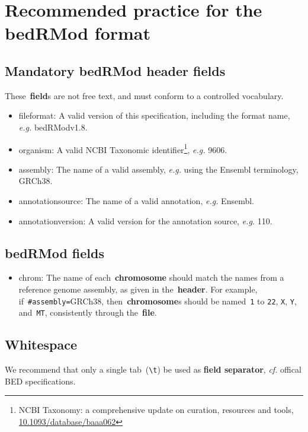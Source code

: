\documentclass[11pt]{article}
\begin{document}
\section{Recommended practice for the \acs{bedRMod} format}

\subsection{Mandatory \acs{bedRMod} header fields}
These~\textbf{field}s are not free text, and must conform to a controlled vocabulary.
\begin{itemize}
\item \textsf{fileformat}: A valid version of this specification, including the format name, \textit{e.g.} bedRModv1.8. 

\item \textsf{organism}: A valid NCBI Taxonomic identifier\footnote{NCBI Taxonomy: a comprehensive update on curation, resources and tools, \url{10.1093/database/baaa062}}, \textit{e.g.} 9606.

\item \textsf{assembly}: The name of a valid assembly, \textit{e.g.} using the Ensembl terminology, GRCh38. 

\item \textsf{annotation\textunderscore source}: The name of a valid annotation, \textit{e.g.} Ensembl. 

\item \textsf{annotation\textunderscore version}: A valid version for the annotation source, \textit{e.g.} 110. 
\end{itemize}

\subsection{\acs{bedRMod} fields}
\begin{itemize}
\item \textsf{chrom}: The name of each~\textbf{chromosome} should match the names from a reference genome assembly, as given in the~\textbf{header}.
  For example, if~\texttt{\#assembly=}GRCh38, then~\textbf{chromosome}s should be named~\texttt{1} to \texttt{22}, \texttt{X}, \texttt{Y}, and~\texttt{MT},
  consistently through the~\textbf{file}.
\end{itemize}

\subsection{Whitespace}\label{sec:whitespace}
We recommend that only a single tab~(\texttt{{\textbackslash}t}) be used as \textbf{field separator}, \textit{cf.} offical \ac{BED} specifications.
\end{document}
